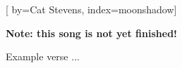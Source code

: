
[%
    by={Cat Stevens},
    index={moonshadow}]


    \label{moonshadow}

    \textbf{Note: this song is not yet finished!}

    \beginverse
        Example verse ...
    \endverse
\endsong
